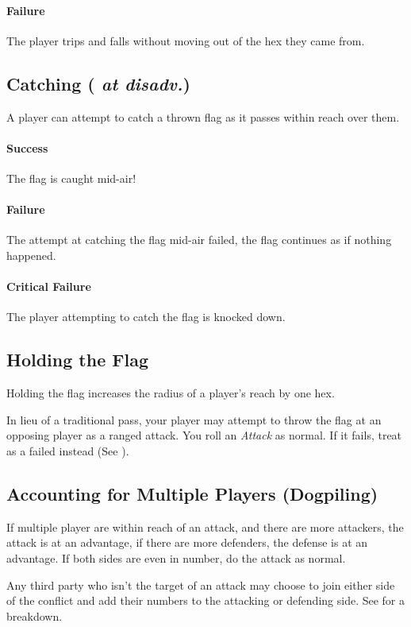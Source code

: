 \paragraph{Failure}
The player trips and falls without moving out of the hex they came from.

\subsection{Catching (\agility{} \textit{at disadv.})}\label{sec:catching}
A player can attempt to catch a thrown flag as it passes within reach over them.
\paragraph{Success}
The flag is caught mid-air!
\paragraph{Failure}
The attempt at catching the flag mid-air failed, the flag continues as if nothing happened.
\paragraph{Critical Failure}
The player attempting to catch the flag is knocked down.

\subsection{Holding the Flag}
Holding the flag increases the radius of a player's reach by one hex.

In lieu of a traditional pass, your player may attempt to throw the flag at an opposing player as a ranged attack.
You roll an \textit{Attack} as normal.
If it fails, treat as a failed \throw{} instead (See ).

\subsection{Accounting for Multiple Players (Dogpiling)}\label{dogpiling}
If multiple player are within reach of an attack, and there are more attackers, the attack is at an advantage, if there are more defenders, the defense is at an advantage. If both sides are even in number, do the attack as normal.

Any third party who isn't the target of an attack may choose to join either side of the conflict and add their numbers to the attacking or defending side.
See  for a breakdown.

